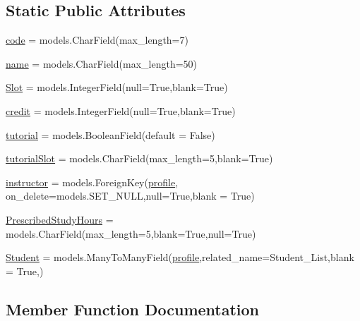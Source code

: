 \subsection*{Static Public Attributes}
\begin{DoxyCompactItemize}
\item 
\hyperlink{classcourses_1_1models_1_1coursedetail_a9f59d9c14eeb6c52b88f406e8fda1bba}{code} = models.\+Char\+Field(max\+\_\+length=7)
\item 
\hyperlink{classcourses_1_1models_1_1coursedetail_a1790df7e26de965bd7c457c2757e1222}{name} = models.\+Char\+Field(max\+\_\+length=50)
\item 
\hyperlink{classcourses_1_1models_1_1coursedetail_abe2db276d6eceaa133f8a9c71f63fb16}{Slot} = models.\+Integer\+Field(null=True,blank=True)
\item 
\hyperlink{classcourses_1_1models_1_1coursedetail_a764d67285a7c578c4c713c6f6106854f}{credit} = models.\+Integer\+Field(null=True,blank=True)
\item 
\hyperlink{classcourses_1_1models_1_1coursedetail_a82d72338e090a124f3b2e09d02f38f79}{tutorial} = models.\+Boolean\+Field(default = False)
\item 
\hyperlink{classcourses_1_1models_1_1coursedetail_ad96479a724c4804c3ab0ca04376ce50c}{tutorial\+Slot} = models.\+Char\+Field(max\+\_\+length=5,blank=True)
\item 
\hyperlink{classcourses_1_1models_1_1coursedetail_aa4921021a1e28f780255c438617a0a74}{instructor} = models.\+Foreign\+Key(\hyperlink{classprofiles_1_1models_1_1profile}{profile}, on\+\_\+delete=models.\+S\+E\+T\+\_\+\+N\+U\+LL,null=True,blank = True)
\item 
\hyperlink{classcourses_1_1models_1_1coursedetail_a02223dcd8341b9f202a17d08fe079282}{Prescribed\+Study\+Hours} = models.\+Char\+Field(max\+\_\+length=5,blank=True,null=True)
\item 
\hyperlink{classcourses_1_1models_1_1coursedetail_a05149c0617696650da4bf98364ff4cee}{Student} = models.\+Many\+To\+Many\+Field(\hyperlink{classprofiles_1_1models_1_1profile}{profile},related\+\_\+name=\textquotesingle{}Student\+\_\+\+List\textquotesingle{},blank = True,)
\end{DoxyCompactItemize}


\subsection{Member Function Documentation}
